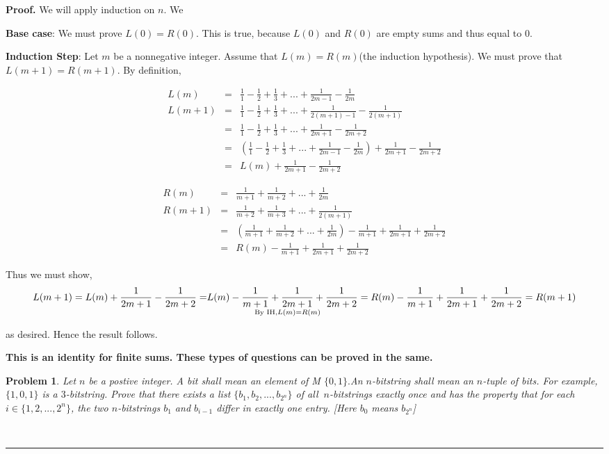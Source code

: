 \documentclass{article}
\newtheorem{problem}[theorem]{Problem}
\newenvironment{proof}[1][Proof]{\noindent\textbf{#1.} }{\ \rule{0.5em}{0.5em}}
\begin{document}
\begin{proof}
We will apply induction on $n$. We

\textbf{Base case}: We must prove $L(0)=R(0)$. This is true, because $L(0)$
and $R(0)$ are empty sums and thus equal to $0.$

\textbf{Induction Step}: Let $m$ be a nonnegative integer. Assume that $%
L(m)=R(m)$(the induction hypothesis). We must prove that $L(m+1)=R(m+1)$. By
definition,

\begin{eqnarray*}
L(m) &=&\frac{1}{1}-\frac{1}{2}+\frac{1}{3}+...+\frac{1}{2m-1}-\frac{1}{2m}
\\
L(m+1) &=&\frac{1}{1}-\frac{1}{2}+\frac{1}{3}+...+\frac{1}{2(m+1)-1}-\frac{1%
}{2(m+1)} \\
&=&\frac{1}{1}-\frac{1}{2}+\frac{1}{3}+...+\frac{1}{2m+1}-\frac{1}{2m+2} \\
&=&(\frac{1}{1}-\frac{1}{2}+\frac{1}{3}+...+\frac{1}{2m-1}-\frac{1}{2m})+%
\frac{1}{2m+1}-\frac{1}{2m+2} \\
&=&L(m)+\frac{1}{2m+1}-\frac{1}{2m+2}
\end{eqnarray*}

\begin{eqnarray*}
R(m) &=&\frac{1}{m+1}+\frac{1}{m+2}+...+\frac{1}{2m} \\
R(m+1) &=&\frac{1}{m+2}+\frac{1}{m+3}+...+\frac{1}{2(m+1)} \\
&=&(\frac{1}{m+1}+\frac{1}{m+2}+...+\frac{1}{2m})-\frac{1}{m+1}+\frac{1}{2m+1%
}+\frac{1}{2m+2} \\
&=&R(m)-\frac{1}{m+1}+\frac{1}{2m+1}+\frac{1}{2m+2}
\end{eqnarray*}

Thus we must show, 
\begin{equation*}
L(m+1)=L(m)+\frac{1}{2m+1}-\frac{1}{2m+2}=\underset{\text{By IH,}L(m)=R(m)}{%
L(m)-\frac{1}{m+1}+\frac{1}{2m+1}+\frac{1}{2m+2}=}R(m)-\frac{1}{m+1}+\frac{1%
}{2m+1}+\frac{1}{2m+2}=R(m+1)
\end{equation*}

as desired. Hence the result follows.

\textbf{This is an identity for finite sums. These types of questions can be
proved in the same.}

\begin{problem}
Let $n$ be a postive integer. A bit shall mean an element of M $\{0,1\}.$An $%
n$-bitstring shall mean an $n$-tuple of bits. For example, $\{1,0,1\}$ is a $%
3$-bitstring. Prove that there exists a list $\{b_{1},b_{2},...,b_{2^{n}}\}$
of all $\ n$-bitstrings exactly once and has the property that for each $%
i\in \{1,2,...,2^{n}\}$, the two $n$-bitstrings $b_{1}$ and $b_{i-1}$ differ
in exactly one entry. [Here $b_{0}$ means $b_{2^{n}}$]
\end{problem}
\end{proof}
\end{document}
